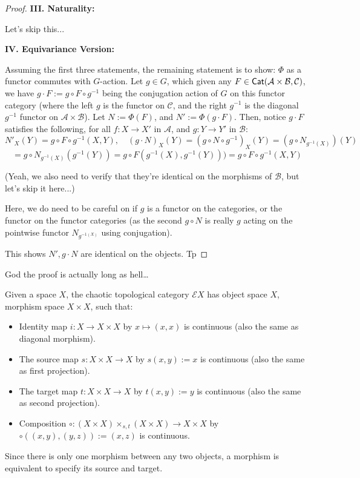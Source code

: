 \documentclass{article}
\begin{document}
\begin{proof}
    \hfil

    \textbf{III. Naturality:}

    Let's skip this...
    

    \hfil

    \textbf{IV. Equivariance Version:}

    Assuming the first three statements, the remaining statement is to show: $\Phi$ as a functor commutes with $G$-action. Let $g\in G$, which given any $F\in\mathsf{Cat}(\mathcal{A}\times\mathcal{B},\mathcal{C})$, we have $g\cdot F:=g\circ F\circ g^{-1}$ being the conjugation action of $G$ on this functor category (where the left $g$ is the functor on $\mathcal{C}$, and the right $g^{-1}$ is the diagonal $g^{-1}$ functor on $\mathcal{A}\times\mathcal{B}$). Let $N := \Phi(F)$, and $N':=\Phi(g\cdot F)$. Then, notice $g\cdot F$ satisfies the following, for all $f:X\rightarrow X'$ in $\mathcal{A}$, and $g:Y\rightarrow Y'$ in $\mathcal{B}$:
    \[N'_X (Y) = g\circ F\circ g^{-1}(X,Y),\quad (g\cdot N)_X (Y) = (g\circ N\circ g^{-1})_X(Y) = (g\circ N_{g^{-1}(X)})(Y)\]
    \[ = g\circ N_{g^{-1}(X)}(g^{-1}(Y)) = g\circ F(g^{-1}(X),g^{-1}(Y))) = g\circ F\circ g^{-1}(X,Y)\]

    (Yeah, we also need to verify that they're identical on the morphisms of $\mathcal{B}$, but let's skip it here...)

    Here, we do need to be careful on if $g$ is a functor on the categories, or the functor on the functor categories (as the second $g\circ N$ is really $g$ acting on the pointwise functor $N_{g^{-1(X)}}$ using conjugation).
    
    This shows $N', g\cdot N$ are identical on the objects. Tp
\end{proof}

God the proof is actually long as hell\dots

\hfil

\begin{defn}
    Given a space $X$, the chaotic topological category $\mathcal{E}X$ has object space $X$, morphism space $X\times X$, such that:
    \begin{itemize}
        \item Identity map $i:X\rightarrow X\times X$ by $x\mapsto (x,x)$ is continuous (also the same as diagonal morphism).
        \item The source map $s:X\times X\rightarrow X$ by $s(x,y):= x$ is continuous (also the same as first projection).
        \item The target map $t:X\times X\rightarrow X$ by $t(x,y):= y$ is continuous (also the same as second projection).
        \item Composition $\circ:(X\times X)\times_{s,t}(X\times X)\rightarrow X\times X$ by $\circ((x,y),(y,z)):= (x,z)$ is continuous.
    \end{itemize}
\end{defn}
Since there is only one morphism between any two objects, a morphism is equivalent to specify its source and target.
\end{document}
